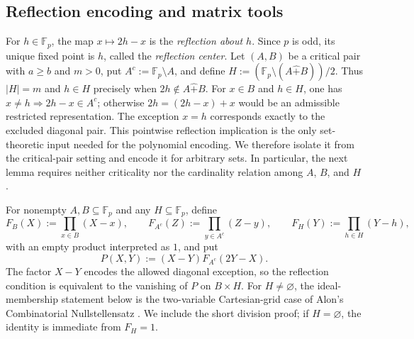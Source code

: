 \documentclass[12pt]{article}
\theoremstyle{remark}
\newcommand{\F}{\mathbb{F}_p}
\newcommand{\rs}{\mathbin{\widehat+}}
\begin{document}
\subsection{Reflection encoding and matrix tools}\label{reflectionclosure}

For $h\in\F$, the map $x\mapsto2h-x$ is the \emph{reflection about $h$}.
Since $p$ is odd, its unique fixed point is $h$, called the
\emph{reflection center}.
Let $(A,B)$ be a critical pair with $a\ge b$ and $m>0$, put
$A^c:=\F\setminus A$, and define $H:=(\F\setminus(A\rs B))/2$.
Thus $|H|=m$ and $h\in H$ precisely when $2h\notin A\rs B$.
For $x\in B$ and $h\in H$, one has $x\ne h\Rightarrow2h-x\in A^c$;
otherwise $2h=(2h-x)+x$ would be an admissible restricted representation.
The exception $x=h$ corresponds exactly to the excluded diagonal pair.
This pointwise reflection implication is the only set-theoretic input
needed for the polynomial encoding.  We therefore isolate it from the
critical-pair setting and encode it for arbitrary sets.  In particular,
the next lemma requires neither criticality nor the cardinality relation
among $A$, $B$, and $H$.

For nonempty $A,B\subseteq\F$ and any $H\subseteq\F$, define
\begin{equation}\label{rootpolys-set}
 F_B(X):=\prod_{x\in B}(X-x),\qquad
 F_{A^c}(Z):=\prod_{y\in A^c}(Z-y),\qquad
 F_H(Y):=\prod_{h\in H}(Y-h),
\end{equation}
with an empty product interpreted as $1$, and put
\begin{equation}\label{reflectionpoly}
 P(X,Y):=(X-Y)F_{A^c}(2Y-X).
\end{equation}
The factor $X-Y$ encodes the allowed diagonal exception, so the
reflection condition is equivalent to the vanishing of $P$ on $B\times H$.
For $H\ne\varnothing$, the ideal-membership statement below is the
two-variable Cartesian-grid case of Alon's Combinatorial Nullstellensatz
\cite[Theorem 1.1]{AlonCN}.  We include the short division proof; if
$H=\varnothing$, the identity is immediate from $F_H=1$.
\end{document}
